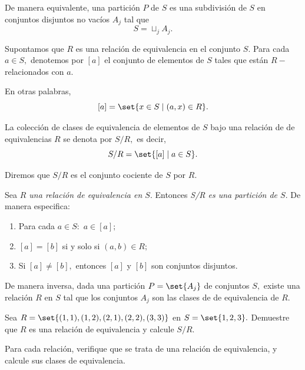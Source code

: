 	
	De manera equivalente, una partición $P$ de $S$ es una subdivisión de $S$ en conjuntos disjuntos no vacíos $A_{j}$ tal que $$S= \sqcup_{j} A_{j}.$$



	Supontamos que $R$ es una relación de equivalencia en el conjunto $S.$ Para cada $a\in S,$ denotemos por $[a]$ el conjunto de elementos de $S$ tales que están $R-$relacionados con $a.$ 
	
	
	En otras palabras,
	$$
	[a]=\set{x \in S \mid (a,x)\in R}.
	$$



	La colección de clases de equivalencia de elementos de $S$ bajo una relación de de equivalencias $R$ se denota por $S/R,$ es decir,
	$$
	S/R=\set{[a] \mid a \in S}.
	$$
	 
	
	Diremos que $S/R$ es el conjunto cociente de $S$ por $R.$



	\begin{thm}
		\label{lip:thm:2.6}
		Sea \emph{$R$ una relación de equivalencia en $S.$} Entonces \emph{S/R es una partición de $S.$} 
		De manera especifica:
		\begin{enumerate}
			\item Para cada $a \in S:$  $a\in [a];$
			\item $[a]=[b]$ si y solo si $(a,b)\in R;$
			\item Si $[a]\neq [b],$ entonces $[a]$ y $[b]$ son conjuntos disjuntos. 
		\end{enumerate}
		
		
		De manera inversa, dada una partición $P=\set{A_{j}}$ de conjuntos $S,$ existe una relación $R$ en $S$ tal que los conjuntos $A_{j}$ son las clases de de equivalencia de $R.$
	\end{thm}
	



	\begin{problema}
		\label{lip:exmp:2.13.b}
		Sea $R=\set{(1,1),(1,2),(2,1),(2,2),(3,3)}$ en $S=\set{1,2,3}.$ Demuestre que $R$ es una relación de equivalencia y calcule $S/R.$
	\end{problema}
	



	\begin{problema}
		Para cada relación, verifique que se trata de una relación de equivalencia, y calcule sus clases de equivalencia.
	\end{problema}
	
